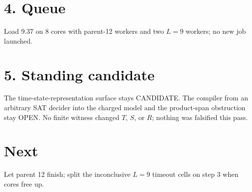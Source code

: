 \documentclass[11pt]{article}
\begin{document}
\section*{4. Queue}
Load 9.37 on 8 cores with parent-12 workers and two $L=9$ workers; no new job launched.

\section*{5. Standing candidate}
The time-state-representation surface stays CANDIDATE. The compiler from an arbitrary SAT decider into the charged model and the product-span obstruction stay OPEN. No finite witness changed $T$, $S$, or $R$; nothing was falsified this pass.

\section*{Next}
Let parent 12 finish; split the inconclusive $L=9$ timeout cells on step 3 when cores free up.
\end{document}
